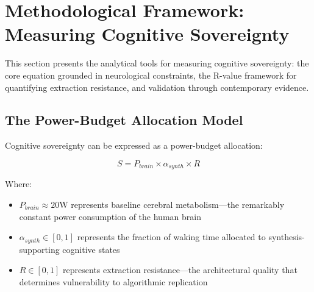 %

\section{Methodological Framework: Measuring Cognitive Sovereignty}
\label{sec:methodology}

This section presents the analytical tools for measuring cognitive sovereignty: the core equation grounded in neurological constraints, the R-value framework for quantifying extraction resistance, and validation through contemporary evidence.

\subsection{The Power-Budget Allocation Model}

Cognitive sovereignty can be expressed as a power-budget allocation:

\begin{equation}
S = P_{brain} \times \alpha_{synth} \times R
\label{eq:sovereignty}
\end{equation}

\noindent Where:
\begin{itemize}
    \item $P_{brain} \approx 20$W represents baseline cerebral metabolism—the remarkably constant power consumption of the human brain \citep{raichle2002}
    \item $\alpha_{synth} \in [0,1]$ represents the fraction of waking time allocated to synthesis-supporting cognitive states
    \item $R \in [0,1]$ represents extraction resistance—the architectural quality that determines vulnerability to algorithmic replication
\end{itemize}

